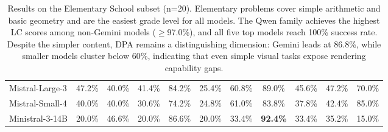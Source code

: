 \documentclass[11pt]{article}
\begin{document}
\begin{table}[!ht]
{\begin{tabular}{lcccc|cccc|cc}
Mistral-Large-3        & 47.2\% & 40.0\% & 41.4\% & 84.2\% & 25.4\% & 60.8\% & 89.0\% & 45.6\% & 47.2\% & 70.0\% \\
Mistral-Small-4        & 40.0\% & 40.0\% & 30.6\% & 74.2\% & 24.8\% & 61.0\% & 83.8\% & 37.8\% & 42.4\% & 85.0\% \\
Ministral-3-14B        & 20.0\% & 46.6\% & 20.0\% & 86.6\% & 20.0\% & 33.4\% & \textbf{92.4\%} & 33.4\% & 35.2\% & 15.0\% \\
\bottomrule
\end{tabular}}
\caption{Results on the Elementary School subset (n=20). Elementary problems cover simple arithmetic and basic geometry and are the easiest grade level for all models. The Qwen family achieves the highest LC scores among non-Gemini models ($\geq$97.0\%), and all five top models reach 100\% success rate. Despite the simpler content, DPA remains a distinguishing dimension: Gemini leads at 86.8\%, while smaller models cluster below 60\%, indicating that even simple visual tasks expose rendering capability gaps.}
\label{tab:results-elementary}
\end{table}
\end{document}
